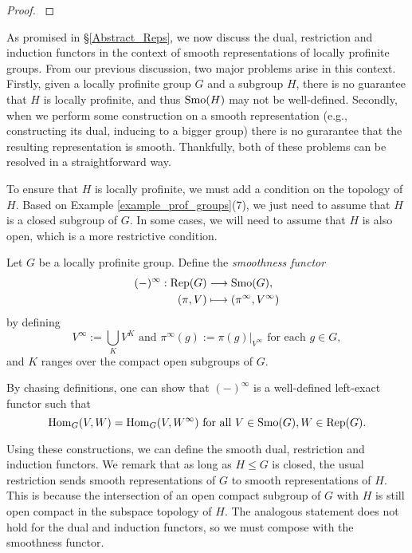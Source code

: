 \begin{proof}
    \cite[Proposition 2.3 and Corollary 1.2]{BH1}
\end{proof}

As promised in \S\ref{Abstract_Reps}, we now discuss the dual, restriction and induction functors in the context of smooth representations of locally profinite groups. From our previous discussion, two major problems arise in this context. Firstly, given a locally profinite group $G$ and a subgroup $H$, there is no guarantee that $H$ is locally profinite, and thus $\mathrm{Smo}(H)$ may not be well-defined. Secondly, when we perform some construction on a smooth representation (e.g., constructing its dual, inducing to a bigger group) there is no gurarantee that the resulting representation is smooth. Thankfully, both of these problems can be resolved in a straightforward way.

To ensure that $H$ is locally profinite, we must add a condition on the topology of $H$. Based on Example \ref{example_prof_groups}(7), we just need to assume that $H$ is a closed subgroup of $G$. In some cases, we will need to assume that $H$ is also open, which is a more restrictive condition. 

\begin{defn}
    Let $G$ be a locally profinite group. Define the \textit{smoothness functor}
    \begin{align*}
        (-)^\infty:\mathrm{Rep}(G)&\longrightarrow\mathrm{Smo}(G),\\
        (\pi,V)&\longmapsto(\pi^\infty,V^\infty)
    \end{align*}
    by defining 
    $$V^\infty:=\bigcup_K V^K \text{  and  } \pi^\infty(g):=\pi(g)|_{V^\infty} \text{  for each  } g\in G,$$ and $K$ ranges over the compact open subgroups of $G$.
\end{defn}

By chasing definitions, one can show that $(-)^\infty$ is a well-defined left-exact functor such that 
$$\mathrm{Hom}_G(V,W)=\mathrm{Hom}_G(V,W^\infty) \text{ for all } V\in\mathrm{Smo}(G), W\in\mathrm{Rep}(G).$$

Using these constructions, we can define the smooth dual, restriction and induction functors. We remark that as long as $H\leq G$ is closed, the usual restriction sends smooth representations of $G$ to smooth representations of $H$. This is because the intersection of an open compact subgroup of $G$ with $H$ is still open compact in the subspace topology of $H$. The analogous statement does not hold for the dual and induction functors, so we must compose with the smoothness functor.

